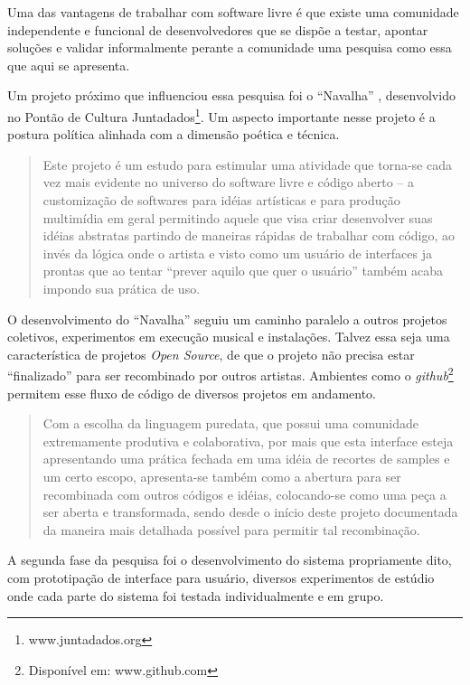 \documentclass[draft]{ppgmus}
\begin{document}
Uma das vantagens de trabalhar com software livre é que existe uma
comunidade independente e funcional de desenvolvedores que se dispõe a
testar, apontar soluções e validar informalmente perante a comunidade
uma pesquisa como essa que aqui se apresenta.

Um projeto próximo que influenciou essa pesquisa foi o ``Navalha'' \cite{navalha}, 
desenvolvido no Pontão de Cultura Juntadados\footnote{www.juntadados.org}.
Um aspecto importante nesse projeto é a postura política alinhada com a dimensão
poética e técnica.
% 


\begin{quote}
Este projeto é um estudo para estimular uma atividade que torna-se cada vez mais evidente no universo 
do software livre e código aberto – a customização de softwares para idéias artísticas e para produção 
multimídia em geral permitindo aquele que visa criar desenvolver suas idéias abstratas partindo de maneiras 
rápidas de trabalhar com código, ao invés da lógica onde o artista e visto como um usuário de interfaces ja 
prontas que ao tentar “prever aquilo que quer o usuário” também acaba impondo sua prática de uso. \cite{navalha}
\end{quote}

O desenvolvimento do ``Navalha'' seguiu um caminho paralelo a outros projetos coletivos, experimentos em 
execução musical e instalações. Talvez essa seja uma característica de projetos \textit{Open Source}, de que
o projeto não precisa estar ``finalizado'' para ser recombinado por outros artistas. Ambientes como o 
\textit{github}\footnote{Disponível em: www.github.com} permitem esse fluxo de código de diversos projetos
em andamento.

\begin{quote}
Com a escolha da linguagem puredata, que possui uma comunidade extremamente produtiva e colaborativa,  
por mais que esta interface esteja apresentando uma prática fechada em uma idéia de recortes de samples e um 
certo escopo, apresenta-se também como a abertura para ser recombinada com outros códigos e idéias, colocando-se 
como uma peça a ser aberta e transformada, sendo desde o início deste projeto documentada da maneira mais detalhada 
possível para permitir tal recombinação. \cite{navalha}
\end{quote}


A segunda fase da pesquisa foi o desenvolvimento do
sistema propriamente dito, com prototipação de interface para usuário,
diversos experimentos de estúdio onde cada parte do sistema foi
testada individualmente e em grupo.
\end{document}
